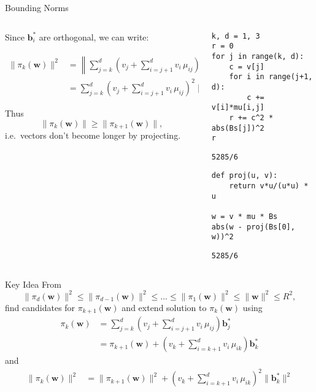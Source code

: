 \documentclass[presentation,smaller]{beamer}
\renewcommand{\vec}[1]{\mathbf{#1}\xspace}
\begin{document}
\begin{frame}[fragile,label={sec:orgee37204}]{Bounding Norms}
 \begin{columns}[t]
\begin{column}{0.6\columnwidth}
Since \(\vec{b}_i^*\) are orthogonal, we can write:

\begin{align*}
\|π_k\left(\vec{w}\right)\|^2 &= \left\|\sum_{j=k}^{d} \left(v_j  + \sum_{i=j+1}^{d} v_i\, \mu_{ij} \right) \vec{b}_j^*\right\|^2\\
&= \sum_{j=k}^{d} \left(v_j  + \sum_{i=j+1}^{d} v_i\, \mu_{ij} \right)^2 \|\vec{b}_j^*\|^2
\end{align*}



Thus \[\|π_{k}(\vec{w})\| ≥ \|π_{k+1}(\vec{w})\|,\] i.e. vectors don’t become longer by projecting.
\end{column}

\begin{column}{0.4\columnwidth}
\lstset{language=sage,label= ,caption= ,captionpos=b,numbers=none}
\begin{lstlisting}
k, d = 1, 3
r = 0
for j in range(k, d):
    c = v[j]
    for i in range(j+1, d):
        c += v[i]*mu[i,j]
    r += c^2 * abs(Bs[j])^2
r
\end{lstlisting}

\begin{verbatim}
5285/6
\end{verbatim}

\lstset{language=sage,label= ,caption= ,captionpos=b,numbers=none}
\begin{lstlisting}
def proj(u, v):
    return v*u/(u*u) * u

w = v * mu * Bs
abs(w - proj(Bs[0], w))^2
\end{lstlisting}

\begin{verbatim}
5285/6
\end{verbatim}
\end{column}
\end{columns}
\end{frame}

\begin{frame}[label={sec:orgbee23f9}]{Key Idea}
From \[\|π_{d}(\vec{w})\|^2 \leq \|π_{d-1}(\vec{w})\|^2 ≤ … ≤ \|π_{1}(\vec{w})\|^2 ≤ \|\vec{w}\|^2 \leq R^2,\] find candidates for \(π_{k+1}(\vec{w})\) and extend solution to \(π_{k}(\vec{w})\) using
\begin{align*}
\pi_k\left(\vec{w}\right) &= \sum_{j=k}^{d} \left(v_j  + \sum_{i=j+1}^{d} v_i\, \mu_{ij} \right) \vec{b}_j^*\\
&=  \pi_{k+1}(\vec{w}) + \left(v_k  + \sum_{i=k+1}^{d} v_i\, \mu_{ik} \right) \vec{b}_k^*
\end{align*}
and
\begin{align*}
\|\pi_k\left(\vec{w}\right)\|^2 
&=  \|\pi_{k+1}(\vec{w})\|^2 + \left(v_k  + \sum_{i=k+1}^{d} v_i\, \mu_{ik} \right)^2 \|\vec{b}_k^*\|^2
\end{align*}
\end{frame}
\end{document}
